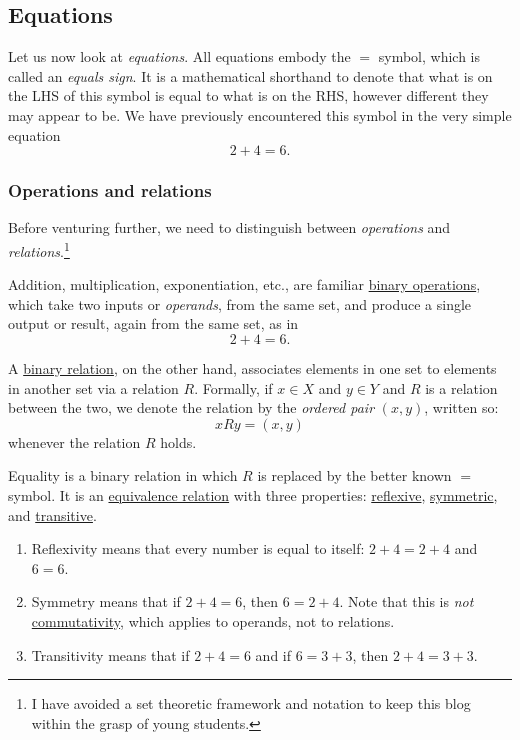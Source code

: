 \documentclass[
  a4paper,
]{article}
\providecommand{\tightlist}{%
  \setlength{\itemsep}{0pt}\setlength{\parskip}{0pt}}
\begin{document}
\subsection{Equations}\label{equations}

Let us now look at \emph{equations}. All equations embody the \(=\)
symbol, which is called an \emph{equals sign}. It is a mathematical
shorthand to denote that what is on the LHS of this symbol is equal to
what is on the RHS, however different they may appear to be. We have
previously encountered this symbol in the very simple equation \[
2 + 4 = 6.
\]

\subsubsection{Operations and relations}\label{operations-and-relations}

Before venturing further, we need to distinguish between
\emph{operations} and \emph{relations}.\footnote{I have avoided a set
  theoretic framework and notation to keep this blog within the grasp of
  young students.}

Addition, multiplication, exponentiation, etc., are familiar
\href{https://en.wikipedia.org/wiki/Binary_operation}{binary
operations}, which take two inputs or \emph{operands}, from the same
set, and produce a single output or result, again from the same set, as
in \[
2 + 4 = 6.
\]

A \href{https://en.wikipedia.org/wiki/Binary_relation}{binary relation},
on the other hand, associates elements in one set to elements in another
set via a relation \(R\). Formally, if \(x \in X\) and \(y \in Y\) and
\(R\) is a relation between the two, we denote the relation by the
\emph{ordered pair} \((x, y)\), written so: \[
xRy = (x, y)
\] whenever the relation \(R\) holds.

Equality is a binary relation in which \(R\) is replaced by the better
known \(=\) symbol. It is an
\href{https://en.wikipedia.org/wiki/Equivalence_relation}{equivalence
relation} with three properties:
\href{https://en.wikipedia.org/wiki/Reflexive_relatio}{reflexive},
\href{https://en.wikipedia.org/wiki/Symmetric_relation}{symmetric}, and
\href{https://en.wikipedia.org/wiki/Transitive_relation}{transitive}.

\begin{enumerate}
\tightlist
\item
  Reflexivity means that every number is equal to itself:
  \(2 + 4 = 2 + 4\) and \(6 = 6\).
\item
  Symmetry means that if \(2 + 4 = 6\), then \(6 = 2 + 4\). Note that
  this is \emph{not}
  \href{https://en.wikipedia.org/wiki/Commutative_property}{commutativity},
  which applies to operands, not to relations.
\item
  Transitivity means that if \(2 + 4 = 6\) and if \(6 = 3 + 3\), then
  \(2 + 4 = 3 + 3\).
\end{enumerate}
\end{document}
